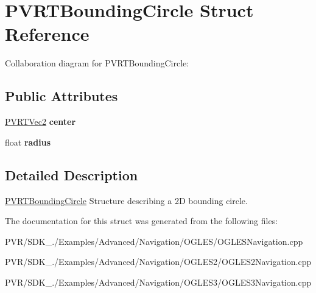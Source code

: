 \hypertarget{struct_p_v_r_t_bounding_circle}{\section{P\+V\+R\+T\+Bounding\+Circle Struct Reference}
\label{struct_p_v_r_t_bounding_circle}
}


Collaboration diagram for P\+V\+R\+T\+Bounding\+Circle\+:
\subsection*{Public Attributes}
\begin{DoxyCompactItemize}
\item 
\hypertarget{struct_p_v_r_t_bounding_circle_a1aa4eed5cc8c723e87276eeaca0dfdb3}{\hyperlink{struct_p_v_r_t_vec2}{P\+V\+R\+T\+Vec2} {\bfseries center}}\label{struct_p_v_r_t_bounding_circle_a1aa4eed5cc8c723e87276eeaca0dfdb3}

\item 
\hypertarget{struct_p_v_r_t_bounding_circle_ab48a3da1c8bec977e691ad57d16d69fe}{float {\bfseries radius}}\label{struct_p_v_r_t_bounding_circle_ab48a3da1c8bec977e691ad57d16d69fe}

\end{DoxyCompactItemize}


\subsection{Detailed Description}


  \hyperlink{struct_p_v_r_t_bounding_circle}{P\+V\+R\+T\+Bounding\+Circle}  Structure describing a 2\+D bounding circle. 

The documentation for this struct was generated from the following files\+:\begin{DoxyCompactItemize}
\item 
P\+V\+R/\+S\+D\+K\+\_./\+Examples/\+Advanced/\+Navigation/\+O\+G\+L\+E\+S/O\+G\+L\+E\+S\+Navigation.\+cpp\item 
P\+V\+R/\+S\+D\+K\+\_./\+Examples/\+Advanced/\+Navigation/\+O\+G\+L\+E\+S2/O\+G\+L\+E\+S2\+Navigation.\+cpp\item 
P\+V\+R/\+S\+D\+K\+\_./\+Examples/\+Advanced/\+Navigation/\+O\+G\+L\+E\+S3/O\+G\+L\+E\+S3\+Navigation.\+cpp\end{DoxyCompactItemize}
